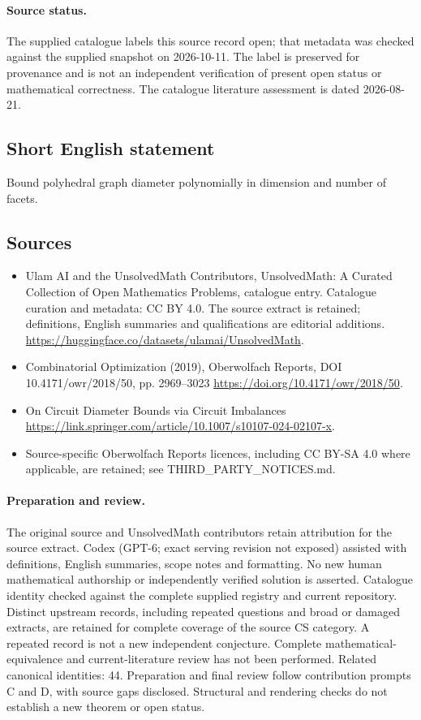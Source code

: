 \documentclass[11pt]{article}
\begin{document}
\paragraph{Source status.}
The supplied catalogue labels this source record open; that metadata was checked against the supplied snapshot on 2026-10-11. The label is preserved for provenance and is not an independent verification of present open status or mathematical correctness. The catalogue literature assessment is dated 2026-08-21.
\subsection{Short English statement}
Bound polyhedral graph diameter polynomially in dimension and number of facets.
\subsection{Sources}
\begin{itemize}
\item[S1] Ulam AI and the UnsolvedMath Contributors, UnsolvedMath: A Curated Collection of Open Mathematics Problems, catalogue entry. Catalogue curation and metadata: CC BY 4.0. The source extract is retained; definitions, English summaries and qualifications are editorial additions.
\url{https://huggingface.co/datasets/ulamai/UnsolvedMath}.
\item[S2] Combinatorial Optimization (2019), Oberwolfach Reports, DOI 10.4171/owr/2018/50, pp. 2969--3023
\url{https://doi.org/10.4171/owr/2018/50}.
\item[S3] On Circuit Diameter Bounds via Circuit Imbalances
\url{https://link.springer.com/article/10.1007/s10107-024-02107-x}.
\item Source-specific Oberwolfach Reports licences, including CC BY-SA 4.0 where applicable, are retained; see THIRD\_PARTY\_NOTICES.md.
\end{itemize}
\paragraph{Preparation and review.}
The original source and UnsolvedMath contributors retain attribution for the source extract. Codex (GPT-6; exact serving revision not exposed) assisted with definitions, English summaries, scope notes and formatting. No new human mathematical authorship or independently verified solution is asserted. Catalogue identity checked against the complete supplied registry and current repository. Distinct upstream records, including repeated questions and broad or damaged extracts, are retained for complete coverage of the source CS category. A repeated record is not a new independent conjecture. Complete mathematical-equivalence and current-literature review has not been performed. Related canonical identities: 44. Preparation and final review follow contribution prompts C and D, with source gaps disclosed. Structural and rendering checks do not establish a new theorem or open status.
\label{end:statement}
\end{document}
